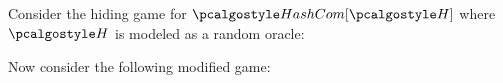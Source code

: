 \ifsolutions
\begin{mysolution}
Consider the hiding game for $\algo{HashCom}[\algo{H}]$ where $\algo{H}$ is modeled as a random oracle:

\begin{figure}[h]
  \begin{center}
    \begin{tcolorbox}[width=8cm]
      \begin{pchstack}
        \pchspace
      \end{pchstack}
    \end{tcolorbox}
  \end{center}
\end{figure}

Now consider the following modified game:


\end{mysolution}
